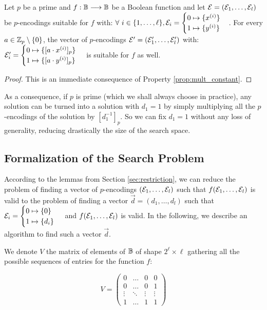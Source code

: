 \begin{lemma}
    Let $p$ be a prime and $f:\mathbb{B} \longrightarrow \mathbb{B}$ be a Boolean function and let $\mathcal{E} = (\mathcal{E}_1, \dots, \mathcal{E}_l)$ be $p$-encodings suitable for $f$ with: $\forall~i \in \{1, \dots, \ell\}, \mathcal{E}_i = \begin{cases} 0 \mapsto \{x^{(i)}\} \\ 1 \mapsto \{y^{(i)}\} \end{cases}$. For every $a \in \mathbb{Z}_p \setminus \{0\}$, the vector of $p$-encodings $\mathcal{E} '= (\mathcal{E}'_1, \dots, \mathcal{E}'_l)$ with: $\mathcal{E}'_i = \begin{cases} 0 \mapsto \{[a \cdot x^{(i)}]_p\} \\ 1 \mapsto \{[a \cdot y^{(i)}]_p\} \end{cases}$
    is suitable for $f$ as well.
    \label{lemma:multiplication_in_prime_group}
\end{lemma}

\begin{proof}
This is an immediate consequence of Property \ref{prop:mult_constant}.
\end{proof}

As a consequence, if $p$ is prime (which we shall always choose in practice), any solution can be turned into a solution with $d_1 = 1$ by simply multiplying all the $p$-encodings of the solution by $[d_1^{-1}]_p$. So we can fix $d_1 = 1$ without any loss of generality, reducing drastically the size of the search space. 





\subsection{Formalization of the Search Problem}

According to the lemmas from Section \ref{sec:restriction}, we can reduce the problem of finding a vector of $p$-encodings $(\mathcal{E}_1, \dots, \mathcal{E}_l)$ such that $f(\mathcal{E}_1, \dots, \mathcal{E}_l)$ is valid to the problem of finding a vector $\vec{d} = (d_1, \dots, d_l)$ such that $\mathcal{E}_i = \begin{cases} 0 \mapsto \{0\} \\ 1 \mapsto \{d_i\} \end{cases}$ and $f(\mathcal{E}_1, \dots, \mathcal{E}_l)$ is valid. In the following, we describe an algorithm to find such a vector $\vec d$.


We denote $V$ the matrix of elements of $\mathbb{B}$ of shape $2^\ell \times \ell$ gathering all the possible sequences of entries for the function $f$:

$$V = \left ( \begin{matrix}
0 & \dots & 0 & 0\\
0 & \dots & 0 & 1\\
\vdots & \ddots & \vdots & \vdots\\
1 & \dots & 1 & 1
\end{matrix}
\right ) $$

